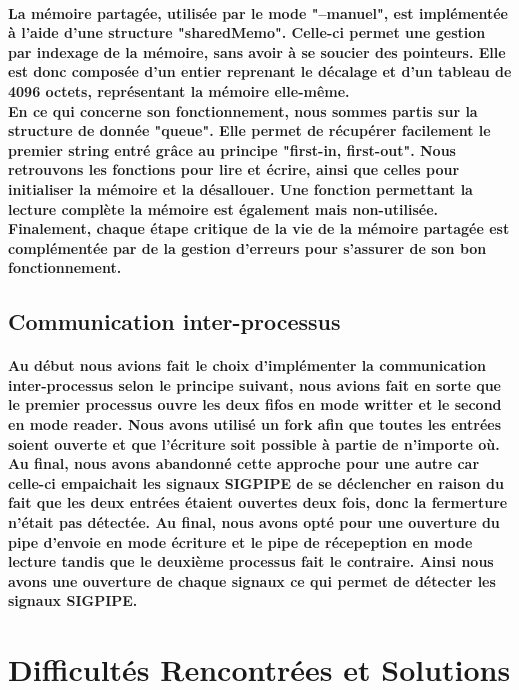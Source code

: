 \documentclass[utf8]{article}
\begin{document}
\paragraph{La mémoire partagée, utilisée par le mode "--manuel", est implémentée à l'aide d'une structure "sharedMemo". Celle-ci permet une gestion
par indexage de la mémoire, sans avoir à se soucier des pointeurs. Elle est donc composée d'un entier reprenant le décalage et d'un tableau de 4096 octets,
représentant la mémoire elle-même. \\En ce qui concerne son fonctionnement, nous sommes partis sur la structure de donnée "queue". Elle
permet de récupérer facilement le premier string entré grâce au principe "first-in, first-out". Nous retrouvons les fonctions pour lire et écrire, ainsi
que celles pour initialiser la mémoire et la désallouer. Une fonction permettant la lecture complète la mémoire est également mais non-utilisée.
Finalement, chaque étape critique de la vie de la mémoire partagée est complémentée par de la gestion d'erreurs pour s'assurer de son bon fonctionnement.}

\subsection{Communication inter-processus}
\paragraph{Au début nous avions fait le choix d'implémenter la communication inter-processus selon le principe
 suivant, nous avions fait en sorte que le premier processus ouvre les deux fifos en mode writter et le second en mode reader.
 Nous avons utilisé un fork afin que toutes les entrées soient ouverte et que l'écriture soit possible à partie de n'importe où.
 Au final, nous avons abandonné cette approche pour une autre car celle-ci empaichait les signaux 
 SIGPIPE de se déclencher en raison du fait que les deux entrées étaient ouvertes deux fois, donc la fermerture n'était pas détectée.
 Au final, nous avons opté pour une ouverture du pipe d'envoie en mode écriture et le pipe de 
 récepeption en mode lecture tandis que le deuxième processus fait le contraire. Ainsi nous avons une ouverture de chaque signaux ce qui permet de détecter les signaux SIGPIPE.}
 

\section{Difficultés Rencontrées et Solutions}
\end{document}
